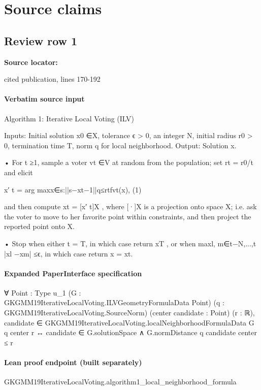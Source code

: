 \documentclass[10pt]{article}
\begin{document}
\clearpage
\hypertarget{source-claim-db9c5a5fe969e1de}{}
\hypertarget{source-section-f10b5f68e4acf3dc}{}
\section*{Source claims}
\subsection*{Review row 1}
\textbf{Source locator:} {\footnotesize\raggedright cited publication, lines 170-\allowbreak{}192\par}
\paragraph{Verbatim source input}
\begin{ReviewVerbatim}
Algorithm 1: Iterative Local Voting (ILV)

Inputs:
Initial solution x0 ∈X, tolerance ϵ > 0, an integer N, initial radius r0 > 0,
termination time T, norm q for local neighborhood.
Output:
Solution x.

• For t ≥1, sample a voter vt ∈V at random from the population; set rt = r0/t
and elicit

x′
t = arg maxx∈{s:||s−xt−1||q≤rt}fvt(x),
(1)

and then compute xt = [x′
t]X , where [·]X is a projection onto space X; i.e. ask
the voter to move to her favorite point within constraints, and then project the
reported point onto X.

• Stop when either t = T, in which case return xT , or when
maxl, m∈{t−N,...,t} |xl −xm| ≤ϵ, in which case return x = xt.
\end{ReviewVerbatim}


\paragraph{Expanded PaperInterface specification}
\begin{ReviewVerbatim}
∀ {Point : Type u_1} (G : GKGMM19IterativeLocalVoting.ILVGeometryFormulaData Point)
  (q : GKGMM19IterativeLocalVoting.SourceNorm) (center candidate : Point) (r : ℝ),
  candidate ∈ GKGMM19IterativeLocalVoting.localNeighborhoodFormulaData G q center r ↔
    candidate ∈ G.solutionSpace ∧ G.normDistance q candidate center ≤ r
\end{ReviewVerbatim}

\paragraph{Lean proof endpoint (built separately)}\begin{ReviewVerbatim}
GKGMM19IterativeLocalVoting.algorithm1_local_neighborhood_formula
\end{ReviewVerbatim}
\end{document}
